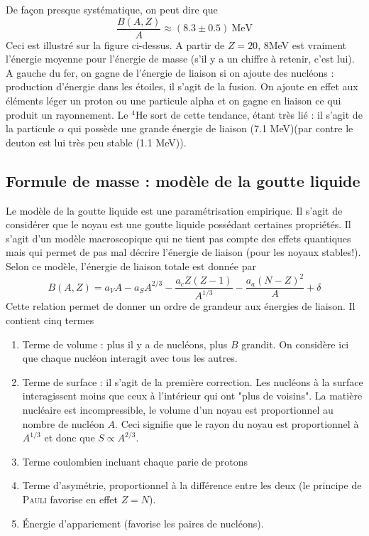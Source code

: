 De façon presque systématique, on peut dire que
\begin{equation}
\dfrac{B(A,Z)}{A} \approx (8.3 \pm 0.5)\ \text{MeV}
\end{equation}
Ceci est illustré sur la figure ci-dessus. A partir de $Z=20$, 8MeV est vraiment l'énergie moyenne pour l'énergie
de masse (s'il y a un chiffre à retenir, c'est lui). A gauche du fer, on gagne de l'énergie de liaison
si on ajoute des nucléons : production d'énergie dans les étoiles, il s'agit de la fusion. On ajoute en 
effet aux éléments léger un proton ou une particule alpha et on gagne en liaison ce qui produit un rayonnement. Le
$^4$He sort de cette tendance, étant très lié : il s'agit de la particule $\alpha$ qui possède une grande énergie
de liaison (7.1 MeV)(par contre le deuton est lui très peu stable (1.1 MeV)).


\subsection{Formule de masse : modèle de la goutte liquide}
Le modèle de la goutte liquide est une paramétrisation empirique. Il s'agit de considérer que le  noyau est une
goutte liquide possédant certaines propriétés. Il s'agit d'un modèle macroscopique qui ne tient pas compte
des effets quantiques mais qui permet de pas mal décrire l'énergie de liaison (pour les noyaux stables!).\\

Selon ce modèle, l'énergie de liaison totale est donnée par
\begin{equation}
B(A,Z) = a_VA - a_SA^{2/3}-\dfrac{a_cZ(Z-1)}{A^{1/3}}-\dfrac{a_a(N-Z)^2}{A}+\delta
\end{equation}
Cette relation permet de donner un ordre de grandeur aux énergies de liaison. Il contient cinq termes
\begin{enumerate}
\item Terme de volume : plus il y a de nucléons, plus $B$ grandit. On considère ici que chaque nucléon 
interagit avec tous les autres.
\item Terme de surface : il s'agit de la première correction. Les nucléons à la surface interagissent 
moins que ceux à l'intérieur qui ont "plus de voisins". La matière nucléaire est incompressible, le volume d'un
noyau est proportionnel au nombre de nucléon $A$. Ceci signifie que le rayon du noyau est proportionnel à 
$A^{1/3}$ et donc que $S\propto A^{2/3}$.
\item  Terme coulombien incluant chaque parie de protons
\item Terme d'asymétrie, proportionnel à la différence entre les deux (le principe de \textsc{Pauli} 
favorise en effet $Z=N$).
\item Énergie d'appariement (favorise les paires de nucléons).
\end{enumerate}\ 


